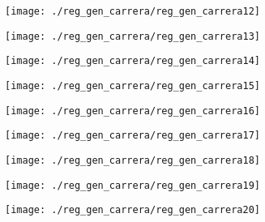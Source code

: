 \begin{figure}[!ht]
    \centering
    \texttt{[image: ./reg\_gen\_carrera/reg\_gen\_carrera12]}
\end{figure}
\clearpage

\begin{figure}[!ht]
    \centering
    \texttt{[image: ./reg\_gen\_carrera/reg\_gen\_carrera13]}
\end{figure}
\clearpage

\begin{figure}[!ht]
    \centering
    \texttt{[image: ./reg\_gen\_carrera/reg\_gen\_carrera14]}
\end{figure}
\clearpage

\begin{figure}[!ht]
    \centering
    \texttt{[image: ./reg\_gen\_carrera/reg\_gen\_carrera15]}
\end{figure}
\clearpage

\begin{figure}[!ht]
    \centering
    \texttt{[image: ./reg\_gen\_carrera/reg\_gen\_carrera16]}
\end{figure}
\clearpage

\begin{figure}[!ht]
    \centering
    \texttt{[image: ./reg\_gen\_carrera/reg\_gen\_carrera17]}
\end{figure}
\clearpage

\begin{figure}[!ht]
    \centering
    \texttt{[image: ./reg\_gen\_carrera/reg\_gen\_carrera18]}
\end{figure}
\clearpage

\begin{figure}[!ht]
    \centering
    \texttt{[image: ./reg\_gen\_carrera/reg\_gen\_carrera19]}
\end{figure}
\clearpage

\begin{figure}[!ht]
    \centering
    \texttt{[image: ./reg\_gen\_carrera/reg\_gen\_carrera20]}
\end{figure}
\clearpage
